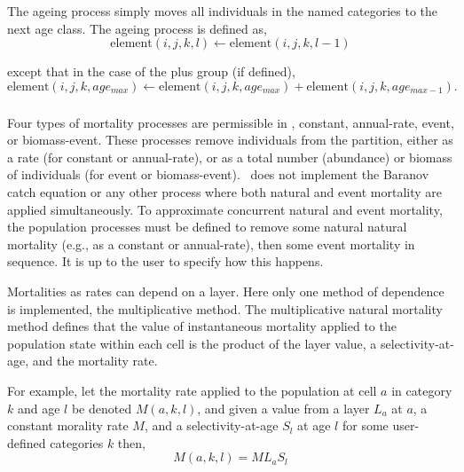 \subsubsection{\label{sec:ageing}}

The ageing process simply moves all individuals in the named categories to the next age class. The ageing process is defined as,
\begin{equation}
  \text{element}(i,j,k,l) \leftarrow \text{element}(i,j,k,l-1)
\end{equation}

except that in the case of the plus group (if defined), 
\begin{equation}
  \text{element}(i,j,k,age_{max}) \leftarrow \text{element}(i,j,k,age_{max}) + \text{element}(i,j,k,age_{max-1}).
\end{equation}

\subsubsection{\label{sec:mortality}}

Four types of mortality processes are permissible in \SPM, constant, annual-rate, event, or biomass-event. These processes remove individuals from the partition, either as a rate (for constant or annual-rate), or as a total number (abundance) or biomass of individuals (for event or biomass-event). \SPM\ does not implement the Baranov catch equation or any other process where both natural and event mortality are applied simultaneously. To approximate concurrent natural and event mortality, the population processes must be defined to remove some natural natural mortality (e.g., as a constant or annual-rate), then some event mortality in sequence. It is up to the user to specify how this happens.

Mortalities as rates can depend on a layer. Here only one method of dependence is implemented, the multiplicative method. The multiplicative natural mortality method defines that the value of instantaneous mortality applied to the population state within each cell is the product of the layer value, a selectivity-at-age, and the mortality rate. 

For example, let the mortality rate applied to the population at cell $a$ in category $k$ and age $l$ be denoted $M(a,k,l)$, and given a value from a layer $L_a$  at $a$, a constant morality rate $M$, and a selectivity-at-age $S_l$ at age $l$ for some user-defined categories $k$ then, 
\begin{equation}
  M(a,k,l) = ML_a S_l 
\end{equation}

